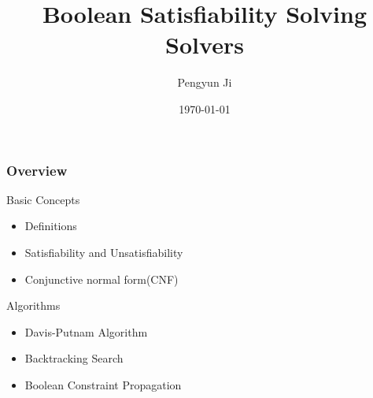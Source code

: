 \documentclass{beamer}
\title[Short title]{Boolean Satisfiability Solving Solvers} %
\author{Pengyun Ji} %
\institute[SWAN] %
{
Swansea University \\ %
\medskip
\textit{jipengyun@hotmail.com} %
}
\date{\today} %
\begin{document}
\begin{frame}
\titlepage %
\end{frame}

\begin{frame}
\frametitle{Overview} %
Basic Concepts
\begin{itemize}
\item Definitions
\item Satisfiability and Unsatisfiability
\item Conjunctive normal form(CNF)
\end{itemize}
Algorithms
\begin{itemize}
\item Davis-Putnam Algorithm
\item Backtracking Search
\item Boolean Constraint Propagation
\end{itemize}
\end{frame}


\end{document}
